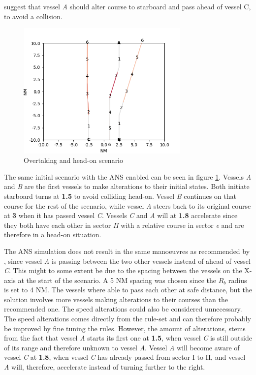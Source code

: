 \textcite{ecolreg_overtaking-and-head-on} suggest that vessel \textit{A} should alter course to starboard and pass ahead of vessel C,  to avoid a collision.



\begin{figure}[H]
    \centering
    \includegraphics[width=0.75\textwidth,height=0.75\textheight,keepaspectratio]{../src/img/overtaking_head_on_res.png}
    \caption{Overtaking and head-on scenario  }
    \label{fig:overtaking-and-head-on-res}
\end{figure}
The same initial scenario with the ANS enabled can be seen in figure \ref{fig:overtaking-and-head-on-res}. Vessels \textit{A} and \textit{B} are the first vessels to make alterations to their initial states. Both initiate starboard turns   at \textbf{1.5} to avoid colliding head-on. Vessel \textit{B} continues on that course for the rest of the scenario, while vessel \textit{A} steers back to its original course at \textbf{3} when it has passed vessel \textit{C}. Vessels \textit{C} and \textit{A} will at \textbf{1.8} accelerate since they both have each other in sector \textit{II} with a relative course in sector \textit{e} and are therefore in a head-on situation.

The ANS simulation does not result in the same manoeuvres as recommended by \textcite{ecolreg_overtaking-and-head-on}, since vessel \textit{A} is passing between the two other vessels instead of ahead of vessel \textit{C}. This might to some extent be due to the spacing between the vessels on the X-axis at the start of the scenario. A 5 NM spacing was chosen since the $R_b$ radius is set to 4 NM. The vessels where able to pass each other at safe distance, but the solution involves  more vessels making alterations to their courses than the recommended one. The speed alterations could also be considered unnecessary. The speed alterations comes directly from the rule-set and can therefore probably be improved by fine tuning the rules. However, the amount of alterations, stems from the fact that vessel \textit{A} starts its first one at \textbf{1.5}, when vessel \textit{C} is still outside of its range and therefore unknown to vessel \textit{A}. Vessel \textit{A} will become aware of vessel \textit{C} at \textbf{1.8}, when vessel \textit{C} has already passed from sector I to II, and vessel \textit{A} will, therefore, accelerate instead of turning further to the right.

